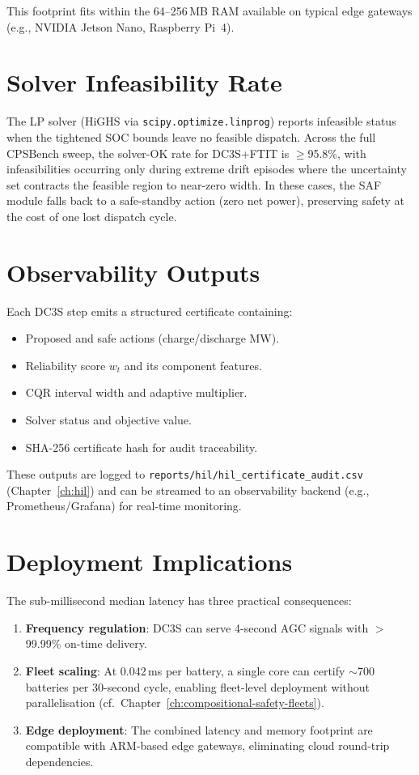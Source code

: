 This footprint fits within the 64--256\,MB RAM available on typical
edge gateways (e.g., NVIDIA Jetson Nano, Raspberry Pi~4).

\section{Solver Infeasibility Rate}

The LP solver (HiGHS via \texttt{scipy.optimize.linprog}) reports
infeasible status when the tightened SOC bounds leave no feasible
dispatch.  Across the full CPSBench sweep, the solver-OK rate for
DC3S+FTIT is $\ge$95.8\%, with infeasibilities occurring only during
extreme drift episodes where the uncertainty set contracts the
feasible region to near-zero width.  In these cases, the SAF module
falls back to a safe-standby action (zero net power), preserving
safety at the cost of one lost dispatch cycle.

\section{Observability Outputs}

Each DC3S step emits a structured certificate containing:
\begin{itemize}
  \item Proposed and safe actions (charge/discharge MW).
  \item Reliability score $w_t$ and its component features.
  \item CQR interval width and adaptive multiplier.
  \item Solver status and objective value.
  \item SHA-256 certificate hash for audit traceability.
\end{itemize}

These outputs are logged to \texttt{reports/hil/hil\_certificate\_audit.csv}
(Chapter~\ref{ch:hil}) and can be streamed to an observability backend
(e.g., Prometheus/Grafana) for real-time monitoring.

\section{Deployment Implications}

The sub-millisecond median latency has three practical consequences:

\begin{enumerate}
  \item \textbf{Frequency regulation}: DC3S can serve 4-second AGC
    signals with $>$99.99\% on-time delivery.
  \item \textbf{Fleet scaling}: At 0.042\,ms per battery, a single
    core can certify $\sim$700 batteries per 30-second cycle, enabling
    fleet-level deployment without parallelisation
    (cf.\ Chapter~\ref{ch:compositional-safety-fleets}).
  \item \textbf{Edge deployment}: The combined latency and memory
    footprint are compatible with ARM-based edge gateways, eliminating
    cloud round-trip dependencies.
\end{enumerate}

